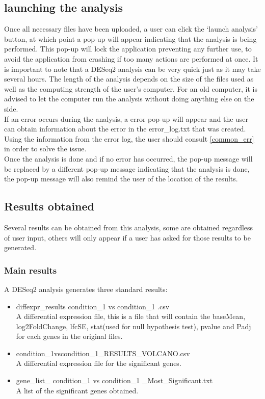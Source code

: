 \documentclass[11pt]{article}
\begin{document}
\subsection{launching the analysis}
Once all necessary files have been uploaded, a user can click the `launch analysis' button, at which point a pop-up will appear indicating that the analysis is being performed. This pop-up will lock the application preventing any further use, to avoid the application from crashing if too many actions are performed at once.
It is important to note that a \acrshort{DESeq2} analysis can be very quick just as it may take several hours. The length of the analysis depends on the size of the files used as well as the computing strength of the user's computer. For an old computer, it is advised to let the computer run the analysis without doing anything else on the side.\\
If an error occurs during the analysis, a error pop-up will appear and the user can obtain information about the error in the error\_log.txt that was created. Using the information from the error log, the user should consult \autoref{common_err} in order to solve the issue.\\
Once the analysis is done and if no error has occurred, the pop-up message will be replaced by a different pop-up message indicating that the analysis is done, the pop-up message will also remind the user of the location of the results.
\subsection{Results obtained}
Several results can be obtained from this analysis, some are obtained regardless of user input, others will only appear if a user has asked for those results to be generated.
\subsubsection{Main results}
A \acrshort{DESeq2} analysis generates three standard results:
\begin{itemize}
\item diffexpr\_results condition\_1 vs condition\_1 .csv\\
A differential expression file, this is a file that will contain the baseMean, log2FoldChange, \acrshort{lfcSE}, stat(used for null hypothesis test), pvalue and \acrshort{Padj} for each genes in the original files.
\item condition\_1vscondition\_1\_RESULTS\_VOLCANO.csv\\
A differential expression file for the significant genes.
\item gene\_list\_ condition\_1 vs condition\_1 \_Most\_Significant.txt\\
A list of the significant genes obtained.
\end{itemize}
\end{document}
